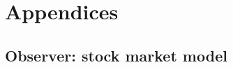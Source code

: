 \documentclass[a4paper]{article}
\begin{document}
\newpage
\printbibliography



\newpage
\appendix

\section{Appendices}

\newpage
\subsection{Observer: stock market model}
\label{app:obs_stock_market}


\end{document}

